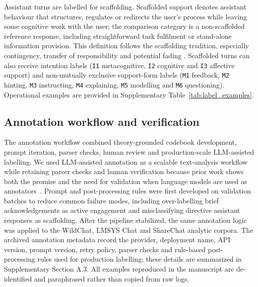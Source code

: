 Assistant turns are labelled for scaffolding. Scaffolded support denotes assistant behaviour that structures, regulates or redirects the user's process while leaving some cognitive work with the user; the comparison category is a non-scaffolded reference response, including straightforward task fulfilment or stand-alone information provision. This definition follows the scaffolding tradition, especially contingency, transfer of responsibility and potential fading \cite{wood1976role,van2010scaffolding,quintana2018scaffolding}. Scaffolded turns can also receive intention labels (\texttt{I1} metacognitive, \texttt{I2} cognitive and \texttt{I3} affective support) and non-mutually exclusive support-form labels (\texttt{M1} feedback, \texttt{M2} hinting, \texttt{M3} instructing, \texttt{M4} explaining, \texttt{M5} modelling and \texttt{M6} questioning). Operational examples are provided in Supplementary Table~\ref{tab:label_examples}.

\subsection{Annotation workflow and verification}

The annotation workflow combined theory-grounded codebook development, prompt iteration, parser checks, human review and production-scale LLM-assisted labelling. We used LLM-assisted annotation as a scalable text-analysis workflow while retaining parser checks and human verification because prior work shows both the promise and the need for validation when language models are used as annotators~\cite{gilardi2023chatgpt,ziems2024can}. Prompt and post-processing rules were first developed on validation batches to reduce common failure modes, including over-labelling brief acknowledgements as active engagement and misclassifying directive assistant responses as scaffolding. After the pipeline stabilized, the same annotation logic was applied to the WildChat, LMSYS Chat and ShareChat analytic corpora. The archived annotation metadata record the provider, deployment name, API version, prompt version, retry policy, parser checks and rule-based post-processing rules used for production labelling; these details are summarized in Supplementary Section A.3. All examples reproduced in the manuscript are de-identified and paraphrased rather than copied from raw logs.

